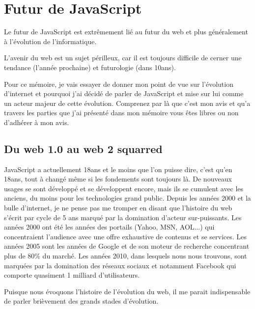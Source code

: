 \section{Futur de JavaScript}

\label{ch:futur}

Le futur de JavaScript est extrêmement lié au futur du web et plus généralement à l'évolution de l'informatique.

L'avenir du web est un sujet périlleux, car il est toujours difficile de cerner une tendance (l'année prochaine) et futurologie (dans 10ans).

Pour ce mémoire, je vais essayer de donner mon point de vue sur l'évolution d'internet et pourquoi j'ai décidé de parler de JavaScript et mise sur lui comme un acteur majeur de cette évolution. Comprenez par là que c'est mon avis et qu'a travers les parties que j'ai présenté dans mon mémoire vous êtes libres ou non d’adhérer à mon avis.

\subsection{Du web 1.0 au web 2 squarred}

JavaScript a actuellement 18ans et le moins que l'on puisse dire, c'est qu'en 18ans, tout à changé même si les fondements sont toujours là. De nouveaux usages se sont développé et se développent encore, mais ils se cumulent avec les anciens, du moins pour les technologies grand public. Depuis les années 2000 et la bulle d'internet, je ne pense pas me tromper en disant que l'histoire du web s'écrit par cycle de 5 ans marqué par la domination d'acteur sur-puissants. Les années 2000 ont été les années des portails (Yahoo, MSN, AOL...) qui concentraient l'audience avec une offre exhaustive de contenus et se services. Les années 2005 sont les années de Google et de son moteur de recherche concentrant plus de 80\% du marché. Les années 2010, dans lesquels nous nous trouvons, sont marquées par la domination des réseaux sociaux et notamment Facebook qui comporte quasiment 1 milliard d'utilisateurs.

Puisque nous évoquons l'histoire de l'évolution du web, il me parait indispensable de parler brièvement des grands stades d'évolution.

